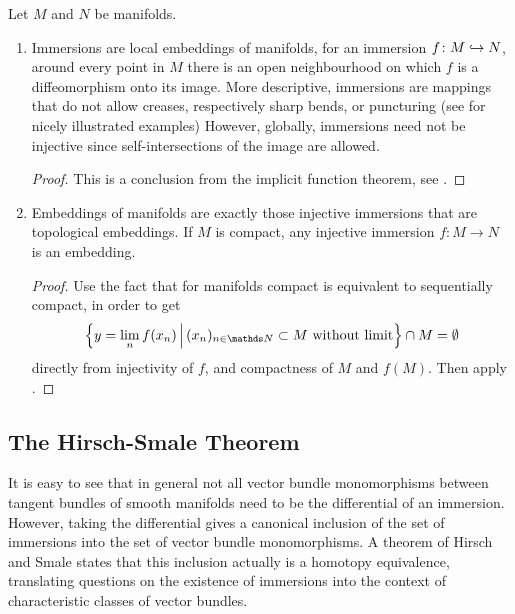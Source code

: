 \begin{Rem}
  Let $M$ and $N$ be manifolds.
  \begin{enumerate}
  \item
    Immersions are local embeddings of manifolds, \idest for an
    immersion $f\colon M\hookrightarrow N$, around every point in $M$
    there is an open neighbourhood on which $f$ is a diffeomorphism
    onto its image.
    More descriptive, immersions are mappings that do not allow creases,
    respectively sharp bends, or puncturing
    (see \forexample \cite{outsidein} for nicely illustrated examples)
    However, globally, immersions need not be injective since
    \forexample self-intersections of the image are allowed.
    \begin{proof}
      This is a conclusion from the implicit function theorem,
      see \forexample \cite[Chap.~1, Theorem~3.1]{hirsch}.
    \end{proof}
  \item Embeddings of manifolds are exactly those injective immersions
    that are topological embeddings.
    If $M$ is compact, any injective immersion $f\colon M\to N$ is an
    embedding.
    \begin{proof}
      Use the fact that for manifolds compact is equivalent to
      sequentially compact, in order to get
      \begin{gather*}
        \left\{
          y=\lim_n f(x_n) \,\middle|\,
          (x_n)_{n\in\Nat}\subset M \text{ without limit}
        \right\} \cap M = \emptyset
      \end{gather*}
      directly from injectivity of $f$, and compactness of $M$ and
      $f(M)$.
      Then apply \cite[Chap.~II, Lemma~2.6]{adachi}.
    \end{proof}
  \end{enumerate}
\end{Rem}

\subsection{The Hirsch-Smale Theorem}\label{sec:hirschsmale}
It is easy to see that in general not all vector bundle monomorphisms
between tangent bundles of smooth manifolds need to be the
differential of an immersion. However, taking the differential gives a
canonical inclusion of the set of immersions into the set of vector
bundle monomorphisms.
A theorem of Hirsch and Smale states that this inclusion
actually is a homotopy equivalence,
translating questions on the existence of immersions into the context
of characteristic classes of vector bundles.

